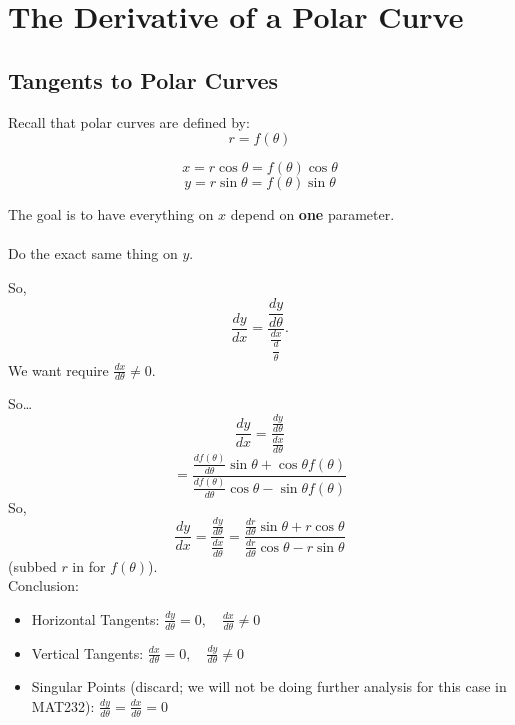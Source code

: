 \documentclass{article}
\begin{document}
\section*{The Derivative of a Polar Curve}
\subsection*{Tangents to Polar Curves}
\begin{definitionbox}
\begin{notebox}
Recall that polar curves are defined by:
\[
    r = f(\theta)
\]
\end{notebox}
\[
    x = r\cos\theta = f(\theta) \cos\theta
\]
\[
    y = r\sin\theta = f(\theta) \sin\theta
\]
\begin{intuitionbox}
The goal is to have everything on \( x \) depend on \textbf{one} parameter. \\
\\
Do the exact same thing on \( y \).
\end{intuitionbox}

So, 
\[
    \dfrac{dy}{dx} = \dfrac{\dfrac{dy}{d\theta}}{\frac{dx}{\dfrac{d}{\theta}}}.
\]
We want require \( \frac{dx}{d\theta} \neq 0 \).

So\dots
\[
    \frac{dy}{dx} = \frac{\frac{dy}{d\theta}}{\frac{dx}{d\theta}}
\]
\[
    = \dfrac{\frac{df(\theta)}{d\theta} \sin\theta + \cos\theta f(\theta)}{\frac{df(\theta)}{d\theta} \cos\theta - \sin\theta f(\theta)}
\]
So,
\[
    \frac{dy}{dx} = \frac{\frac{dy}{d\theta}}{\frac{dx}{d\theta}} = \dfrac{\frac{dr}{d\theta} \sin\theta + r \cos\theta}{\frac{dr}{d\theta} \cos\theta - r \sin\theta}
\]
(subbed \( r \) in for \( f(\theta) \)).
\underline
\\
{Conclusion:}
\begin{itemize}
    \item Horizontal Tangents: \( \frac{dy}{d\theta} = 0, \quad \frac{dx}{d\theta} \neq 0 \)
    \item Vertical Tangents: \( \frac{dx}{d\theta} = 0, \quad \frac{dy}{d\theta} \neq 0 \)
    \item Singular Points (discard; we will not be doing further analysis for this case in MAT232): \( \frac{dy}{d\theta} = \frac{dx}{d\theta} = 0 \)
\end{itemize}

\end{definitionbox}
\end{document}

